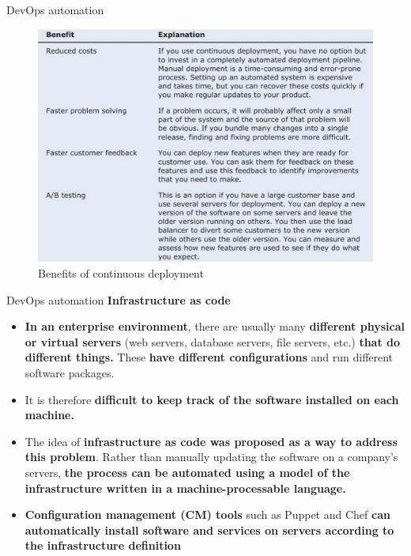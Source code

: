 \documentclass{beamer}
\begin{document}
\begin{frame}{DevOps automation}
	\begin{figure}
		\includegraphics[scale=.43]{img/m3_45}
		\caption{Benefits of continuous deployment}
	\end{figure}
\end{frame}
\begin{frame}{DevOps automation}
	\textbf{Infrastructure as code}
	\begin{itemize}
		\item \textbf{In an enterprise environment}, there are usually many \textbf{different physical or virtual servers} (web servers, database servers, file servers, etc.) \textbf{that do different things.} These \textbf{have different configurations} and run different software packages. 
		\item It is therefore \textbf{difficult to keep track of the software installed on each machine.}
		\item The idea of\textbf{ infrastructure as code was proposed as a way to address this problem}. Rather than manually updating the software on a company’s servers, \textbf{the process can be automated using a model of the infrastructure written in a machine-processable language. }
		\item \textbf{Configuration management (CM) tools }such as Puppet and Chef \textbf{can automatically install software and services on servers according to the infrastructure definition}
		
	\end{itemize}
\end{frame}
\end{document}
